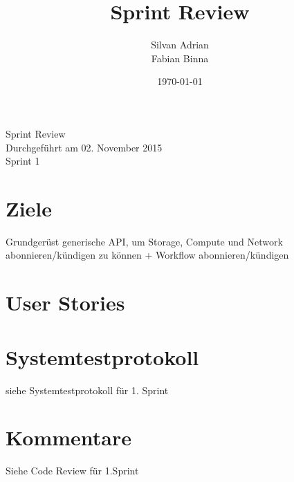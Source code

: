 \documentclass[11pt]{scrartcl}
\title{Sprint Review}
\author{Silvan Adrian \\ Fabian Binna}
\date{\today{}}
\begin{document}
\def\arraystretch{1.5}
\begin{titlepage}
\begin{center}
\vspace{10em}

\vspace{10em}
\end{center}
\begin{center}
\huge {Sprint Review}\\

Durchgeführt am 02. November 2015\\
Sprint 1
\end{center}

\end{titlepage}

\newpage
\tableofcontents
\newpage

\section{Ziele}
Grundgerüst generische API, um Storage, 
Compute und Network abonnieren/kündigen zu können + 
Workflow abonnieren/kündigen

\section{User Stories}



\newpage

\section{Systemtestprotokoll}

siehe Systemtestprotokoll für 1. Sprint

\section{Kommentare}

Siehe Code Review für 1.Sprint
\end{document}
